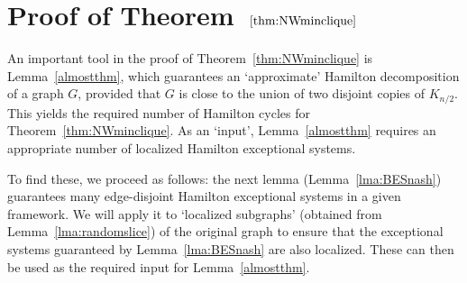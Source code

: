 \documentclass{memo-l}
\numberwithin{section}{chapter}
\numberwithin{equation}{section}
\numberwithin{firstthm}{section}
\numberwithin{figure}{section}
\begin{document}
\section{Proof of Theorem~$\text{\ref{thm:NWminclique}}$} \label{sec:NWminclique}

An important tool in the proof of Theorem~\ref{thm:NWminclique} is Lemma~\ref{almostthm},
which guarantees an `approximate' Hamilton decomposition of a graph $G$, provided that $G$ is close to the union of 
two disjoint copies of $K_{n/2}$. This yields the required number of Hamilton cycles for Theorem~\ref{thm:NWminclique}.
As an `input', Lemma~\ref{almostthm} requires an appropriate number of localized Hamilton exceptional systems.

To find these, we proceed as follows: the next lemma (Lemma~\ref{lma:BESnash}) guarantees many edge-disjoint
Hamilton exceptional systems in a given framework. 
We will apply it to `localized subgraphs' (obtained from Lemma~\ref{lma:randomslice}) of the original graph
to ensure that the exceptional systems guaranteed by Lemma~\ref{lma:BESnash} are also localized.
These can then be used as the required input for Lemma~\ref{almostthm}.
\end{document}
